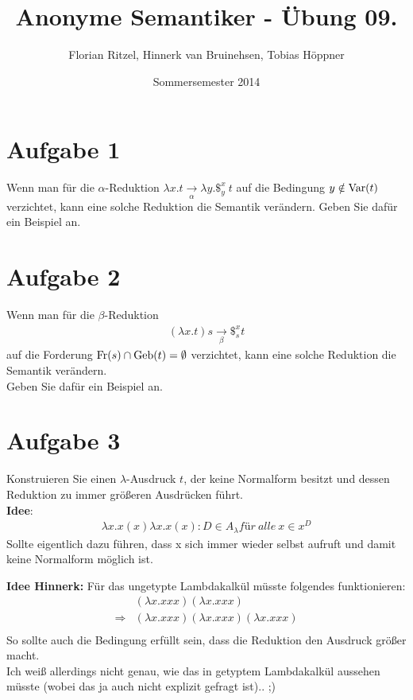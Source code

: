 \documentclass[ngerman,a4paper]{report}
\author{Florian Ritzel, Hinnerk van Bruinehsen, Tobias Höppner}
\title{Anonyme Semantiker - Übung 09. }
\date{Sommersemester 2014}
\renewcommand{\maketitle}{}
\begin{document}
\maketitle
\section*{Aufgabe 1}
Wenn man für die $\alpha$-Reduktion $\lambda x.t \xrightarrow[\alpha]{} \lambda y.\$_y^x\ t$ auf die Bedingung $y \notin \text{\lstinline!Var!}(t)$ verzichtet, kann eine solche Reduktion die Semantik verändern. Geben Sie dafür ein Beispiel an.\\

\section*{Aufgabe 2}
Wenn man für die $\beta$-Reduktion
\begin{align*}
(\lambda x.t) s \xrightarrow[\beta]{} \$_s^x t
\end{align*}
auf die Forderung $\text{\lstinline!Fr!}(s) \cap \text{\lstinline!Geb!}(t) = \emptyset$ verzichtet, kann eine solche Reduktion die Semantik verändern.\\
Geben Sie dafür ein Beispiel an.

\section*{Aufgabe 3}
Konstruieren Sie einen $\lambda$-Ausdruck $t$, der keine Normalform besitzt und dessen Reduktion zu immer größeren Ausdrücken führt.\\
\textbf{Idee}:
\begin{align*}
\lambda x. x (x) \lambda x. x (x) : D \in A_\lambda für\ alle\ x \in x^D
\end{align*}
Sollte eigentlich dazu führen, dass x sich immer wieder selbst aufruft und damit keine Normalform möglich ist.

\textbf{Idee Hinnerk:}
Für das ungetypte Lambdakalkül müsste folgendes funktionieren:\\
\begin{align*}
	&    (\lambda x.xxx)(\lambda x.xxx)\\
	\Rightarrow&(\lambda x.xxx)(\lambda x.xxx)(\lambda x.xxx)\\
\end{align*}
So sollte auch die Bedingung erfüllt sein, dass die Reduktion den Ausdruck größer macht.\\
Ich weiß allerdings nicht genau, wie das in getyptem Lambdakalkül aussehen müsste (wobei das ja auch nicht explizit gefragt ist).. ;)
\end{document}
